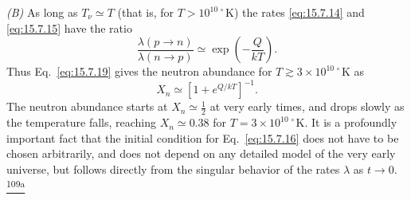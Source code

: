 \emph{(B)} As long as \(T_\nu\simeq T\) (that is, for
\(T>10^{10\,\circ}\mathrm K\)) the rates \eqref{eq:15.7.14} and
\eqref{eq:15.7.15} have the ratio
\begin{equation}
  \frac{\lambda(p\to n)}{\lambda(n\to p)}
  \simeq
  \exp\left(-\frac{Q}{kT}\right).
  \tag{15.7.20}\label{eq:15.7.20}
\end{equation}
Thus Eq.~\eqref{eq:15.7.19} gives the neutron abundance for
\(T\gtrsim3\times10^{10\,\circ}\mathrm K\) as
\begin{equation}
  X_n\simeq[1+e^{Q/kT}]^{-1}.
  \tag{15.7.21}\label{eq:15.7.21}
\end{equation}
The neutron abundance starts at \(X_n\simeq\tfrac12\) at very early times,
and drops slowly as the temperature falls, reaching \(X_n\simeq0.38\) for
\(T=3\times10^{10\,\circ}\mathrm K\). It is a profoundly important fact
that the initial condition for Eq.~\eqref{eq:15.7.16} does not have to be
chosen arbitrarily, and does not depend on any detailed model of the very
early universe, but follows directly from the singular behavior of the rates
\(\lambda\) as \(t\to0\).%
\hyperref[ch15-ref-109a]{\textsuperscript{109a}}

